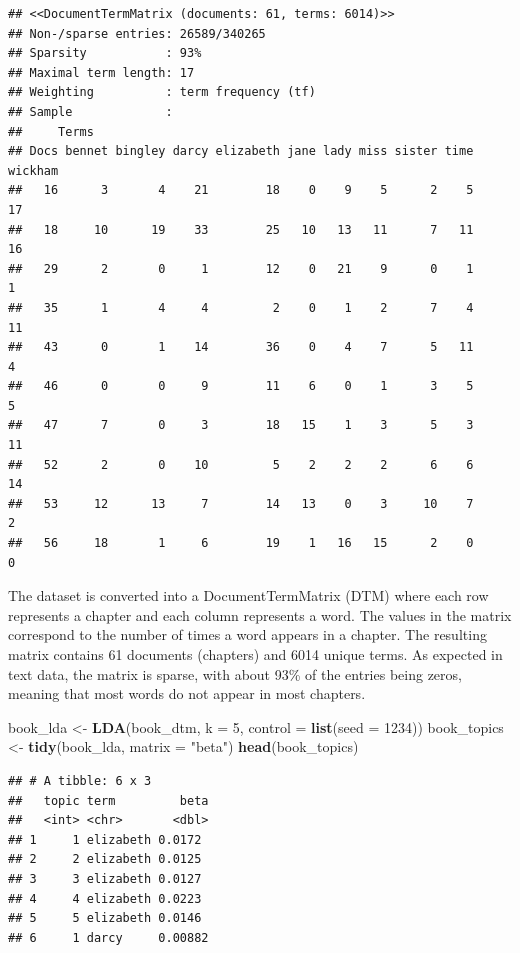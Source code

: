 \documentclass[
]{article}
\newenvironment{Shaded}{\begin{snugshade}}{\end{snugshade}}
\newcommand{\AttributeTok}[1]{\textcolor[rgb]{0.13,0.29,0.53}{#1}}
\newcommand{\DecValTok}[1]{\textcolor[rgb]{0.00,0.00,0.81}{#1}}
\newcommand{\FunctionTok}[1]{\textcolor[rgb]{0.13,0.29,0.53}{\textbf{#1}}}
\newcommand{\NormalTok}[1]{#1}
\newcommand{\OtherTok}[1]{\textcolor[rgb]{0.56,0.35,0.01}{#1}}
\newcommand{\StringTok}[1]{\textcolor[rgb]{0.31,0.60,0.02}{#1}}
\begin{document}
\begin{verbatim}
## <<DocumentTermMatrix (documents: 61, terms: 6014)>>
## Non-/sparse entries: 26589/340265
## Sparsity           : 93%
## Maximal term length: 17
## Weighting          : term frequency (tf)
## Sample             :
##     Terms
## Docs bennet bingley darcy elizabeth jane lady miss sister time wickham
##   16      3       4    21        18    0    9    5      2    5      17
##   18     10      19    33        25   10   13   11      7   11      16
##   29      2       0     1        12    0   21    9      0    1       1
##   35      1       4     4         2    0    1    2      7    4      11
##   43      0       1    14        36    0    4    7      5   11       4
##   46      0       0     9        11    6    0    1      3    5       5
##   47      7       0     3        18   15    1    3      5    3      11
##   52      2       0    10         5    2    2    2      6    6      14
##   53     12      13     7        14   13    0    3     10    7       2
##   56     18       1     6        19    1   16   15      2    0       0
\end{verbatim}

The dataset is converted into a DocumentTermMatrix (DTM) where each row
represents a chapter and each column represents a word. The values in
the matrix correspond to the number of times a word appears in a
chapter. The resulting matrix contains 61 documents (chapters) and 6014
unique terms. As expected in text data, the matrix is sparse, with about
93\% of the entries being zeros, meaning that most words do not appear
in most chapters.

\begin{Shaded}
\begin{Highlighting}[]
\NormalTok{book\_lda }\OtherTok{\textless{}{-}} \FunctionTok{LDA}\NormalTok{(book\_dtm, }\AttributeTok{k =} \DecValTok{5}\NormalTok{, }\AttributeTok{control =} \FunctionTok{list}\NormalTok{(}\AttributeTok{seed =} \DecValTok{1234}\NormalTok{))}
\NormalTok{book\_topics }\OtherTok{\textless{}{-}} \FunctionTok{tidy}\NormalTok{(book\_lda, }\AttributeTok{matrix =} \StringTok{"beta"}\NormalTok{)}
\FunctionTok{head}\NormalTok{(book\_topics)}
\end{Highlighting}
\end{Shaded}

\begin{verbatim}
## # A tibble: 6 x 3
##   topic term         beta
##   <int> <chr>       <dbl>
## 1     1 elizabeth 0.0172 
## 2     2 elizabeth 0.0125 
## 3     3 elizabeth 0.0127 
## 4     4 elizabeth 0.0223 
## 5     5 elizabeth 0.0146 
## 6     1 darcy     0.00882
\end{verbatim}
\end{document}
